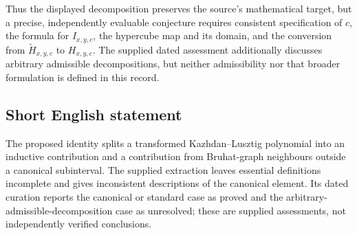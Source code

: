 \documentclass[11pt]{article}
\begin{document}
Thus the displayed decomposition preserves the source's mathematical target, but a precise, independently evaluable conjecture requires consistent specification of \(c\), the formula for \(I_{x,y,c}\), the hypercube map and its domain, and the conversion from \(\widetilde H_{x,y,c}\) to \(H_{x,y,c}\). The supplied dated assessment additionally discusses arbitrary admissible decompositions, but neither admissibility nor that broader formulation is defined in this record.
\subsection{Short English statement}
The proposed identity splits a transformed Kazhdan--Lusztig polynomial into an inductive contribution and a contribution from Bruhat-graph neighbours outside a canonical subinterval. The supplied extraction leaves essential definitions incomplete and gives inconsistent descriptions of the canonical element. Its dated curation reports the canonical or standard case as proved and the arbitrary-admissible-decomposition case as unresolved; these are supplied assessments, not independently verified conclusions.
\end{document}
